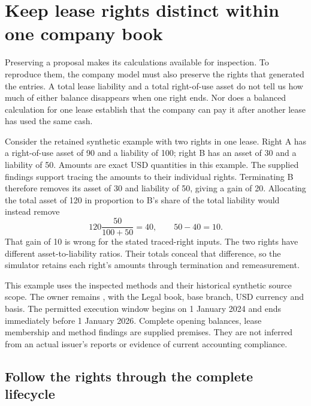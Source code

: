 \section{Keep lease rights distinct within one company book}
\label{sec:lease-shared-book}

Preserving a proposal makes its calculations available for inspection. To
reproduce them, the company model must also preserve the rights that generated
the entries. A total lease liability and a total right-of-use asset do not tell
us how much of either balance disappears when one right ends. Nor does a
balanced calculation for one lease establish that the company can pay it after
another lease has used the same cash.

Consider the retained synthetic example with two rights in one lease. Right A
has a right-of-use asset of 90 and a liability of 100; right B has an asset of
30 and a liability of 50. Amounts are exact USD quantities in this example.
The supplied findings support tracing the amounts to their individual rights.
Terminating B therefore removes its asset of 30 and liability of 50, giving a
gain of 20. Allocating the total asset of 120 in proportion to B's share of the
total liability would instead remove
\[
  120\frac{50}{100+50}=40,
  \qquad 50-40=10.
\]
That gain of 10 is wrong for the stated traced-right inputs. The two rights
have different asset-to-liability ratios. Their totals conceal that difference,
so the simulator retains each right's amounts through termination and
remeasurement.

This example uses the inspected  methods and their
historical synthetic source scope. The owner remains
, with the Legal book, base branch, USD
currency and  basis. The permitted execution
window begins on 1 January 2024 and ends immediately before 1 January 2026.
Complete opening balances, lease membership and method findings are supplied
premises. They are not inferred from an actual issuer's reports or evidence of
current accounting compliance.

\subsection{Follow the rights through the complete lifecycle}

